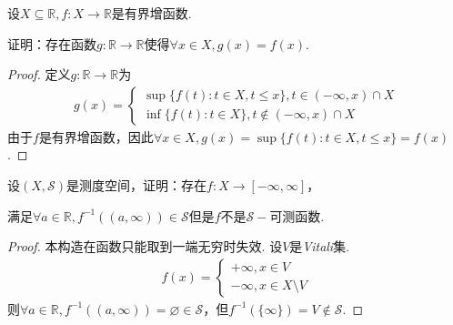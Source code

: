 \begin{comment}
    \begin{problem}[25]\label{2.B.25}
        设\(X \subseteq \mathbb{R}, f: X \to \mathbb{R}\)是增函数.
        
        证明：存在严格增函数序列\(f_1, f_2, \dots: X \to \mathbb{R}\)使得\(\lim_{n \to \infty}f_n(x)=f(x)\).
    \end{problem}

    \begin{proof}
        令\(f_k(x)=f(x)+x/n\)，易证\(f_k'(x)=f'(x)+1/n>0\)且\(\lim_{n \to \infty}f_n(x)=f(x)\).
    \end{proof}
\end{comment}

\begin{problem}[26]\label{2.B.26}
    设\(X \subseteq \mathbb{R}, f: X \to \mathbb{R}\)是有界增函数.
    
    证明：存在函数\(g: \mathbb{R} \to \mathbb{R}\)使得\(\forall x \in X, g(x)=f(x)\).
\end{problem}

\begin{proof}
    定义\(g: \mathbb{R} \to \mathbb{R}\)为
    \begin{align*}
        g(x)=
        \begin{cases}
            \sup \{f(t): t \in X, t \leq x\}, t \in (-\infty, x) \cap X \\
            \inf \{f(t): t \in X\}, t \notin (-\infty, x) \cap X
        \end{cases}
    \end{align*}
    由于\(f\)是有界增函数，因此\(\forall x \in X, g(x)=\sup \{f(t): t \in X, t \leq x\}=f(x)\).
\end{proof}

\begin{problem}[27]\label{2.B.27}
    设\((X, \mathcal{S})\)是测度空间，证明：存在\(f: X \to [-\infty, \infty]\)，
    
    满足\(\forall a \in \mathbb{R}, f^{-1}((a, \infty)) \in \mathcal{S}\)但是\(f\)不是\(\mathcal{S}-\)可测函数.
\end{problem}

\begin{proof}
    {\kaishu 本构造在函数只能取到一端无穷时失效.} 设\(V\)是\textit{Vitali}集.
    \begin{align*}
        f(x)=
        \begin{cases}
            +\infty, x \in V \\
            -\infty, x \in X \setminus V 
        \end{cases}
    \end{align*}
    则\(\forall a \in \mathbb{R}, f^{-1}((a,\infty))=\varnothing \in \mathcal{S}\)，但\(f^{-1}(\{\infty\})=V \notin \mathcal{S}\).
\end{proof}

